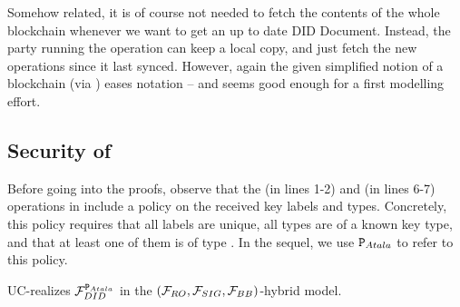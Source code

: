 Somehow related, it is of course not needed to fetch the contents of the whole
blockchain whenever we want to get an up to date DID Document. Instead, the
party running the operation can keep a local copy, and just fetch the new
operations since it last synced. However, again the given simplified notion of
a blockchain (via \IdealFaobb) eases notation -- and seems good enough for a
first modelling effort.

\subsection{Security of \RealPKIDIDAtala}
\label{ssec:sec-didatala}

Before going into the proofs, observe that the  (in lines 1-2) and
 (in lines 6-7) operations in \RealPKIDIDAtala include a policy on
the received key labels and types. Concretely, this policy requires that all
labels are unique, all types are of a known key type, and that at least one of
them is of type \MasterKey. In the sequel, we use $\P_{Atala}$ to refer to this
policy.

\begin{theorem}
  \label{thm:sec-didatala}
  \RealPKIDIDAtala UC-realizes $\IdealFPKIDID^{\P_{Atala}}$ in the $(\IdealFRO,
  \IdealFSig, \IdealFaobb)$-hybrid model.
\end{theorem}

